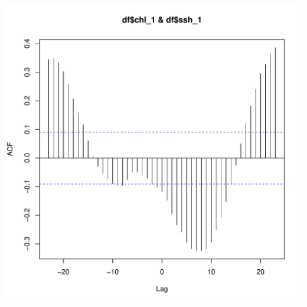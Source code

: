 \documentclass{article}\usepackage[]{graphicx}\usepackage[]{color}
\makeatletter
\def\maxwidth{ %
  \ifdim\Gin@nat@width>\linewidth
    \linewidth
  \else
    \Gin@nat@width
  \fi
}
\newenvironment{knitrout}{}{} %
\makeatother
\begin{document}
\begin{knitrout}
\includegraphics[width=\maxwidth]{figure/unnamed-chunk-11-2} 

\end{knitrout}
\end{document}
